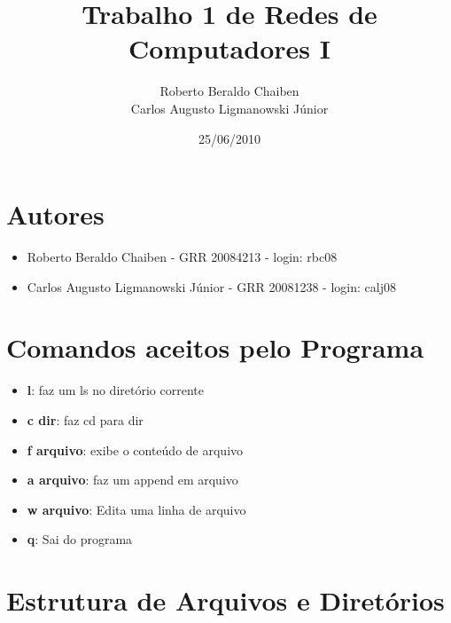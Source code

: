 \documentclass{article}
\title{Trabalho 1 de Redes de Computadores I}
\author{Roberto Beraldo Chaiben  \\ Carlos Augusto Ligmanowski Júnior }
\date{25/06/2010}
\begin{document}
\maketitle


\section{Autores}


\begin{itemize}

	\item Roberto Beraldo Chaiben - GRR 20084213 - login: rbc08
	
	\item Carlos Augusto Ligmanowski Júnior - GRR 20081238 - login: calj08

\end{itemize}


\section{Comandos aceitos pelo Programa}


\begin{itemize}

	\item \textbf{l}: faz um ls no diretório corrente
	
	\item \textbf{c dir}: faz cd para dir
	
	\item \textbf{f arquivo}: exibe o conteúdo de arquivo
	
	\item \textbf{a arquivo}: faz um append em arquivo
	
	\item \textbf{w arquivo}: Edita uma linha de arquivo
		
	\item \textbf{q}: Sai do programa 
	
\end{itemize}


\section{Estrutura de Arquivos e Diretórios}
\end{document}
